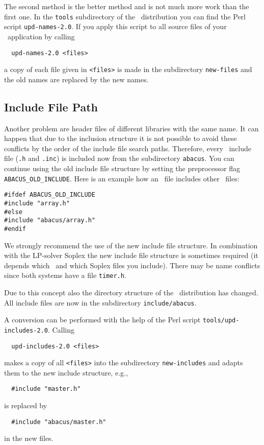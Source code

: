 The second method is the better method and is not much more work than
the first one. In the {\tt tools} subdirectory of the \ABACUS\
distribution you can find the Perl script 
{\tt upd-names-2.0}.
If you apply this script to all source files of your \ABACUS\
application by calling
\begin{verbatim}
  upd-names-2.0 <files>
\end{verbatim}
a copy of each file given in {\tt <files>} is made in the subdirectory
{\tt new-files} and the old names are replaced by the new names. 

\subsection{Include File Path}
\label{section:includeFilePath}

Another problem are header files of different
libraries with the same name. It can happen that due to the inclusion
structure it is not possible to avoid these conflicts by the order 
of the include file search paths. Therefore, every \ABACUS\ include
file ({\tt *.h} and {\tt *.inc}) is included now from the subdirectory 
{\tt abacus}. You can continue using the old include file structure by
setting the preprocessor flag 
{\tt ABACUS\_OLD\_INCLUDE}. Here is an
example how an \ABACUS\ file includes other \ABACUS\ files:
\begin{verbatim}
#ifdef ABACUS_OLD_INCLUDE
#include "array.h"
#else
#include "abacus/array.h"
#endif
\end{verbatim}
We strongly recommend the use of the new include file structure.
In combination with the LP-solver Soplex the new include file
structure is sometimes required (it depends which \ABACUS\ and
which Soplex files you include). There may be name conflicts since both
systems have a file {\tt timer.h}.

Due to this concept also the directory structure of the \ABACUS\
distribution has changed. All include files are now in the
subdirectory {\tt include/abacus}. 

A conversion can be performed with the help of the Perl script 
{\tt tools/upd-includes-2.0}.
 Calling
\begin{verbatim}
  upd-includes-2.0 <files>
\end{verbatim}
makes a copy of all {\tt <files>} into the subdirectory 
{\tt new-includes} and adapts them to the new include structure, e.g.,
\begin{verbatim}
  #include "master.h"
\end{verbatim}
is replaced by
\begin{verbatim}
  #include "abacus/master.h"
\end{verbatim}
in the new files.

